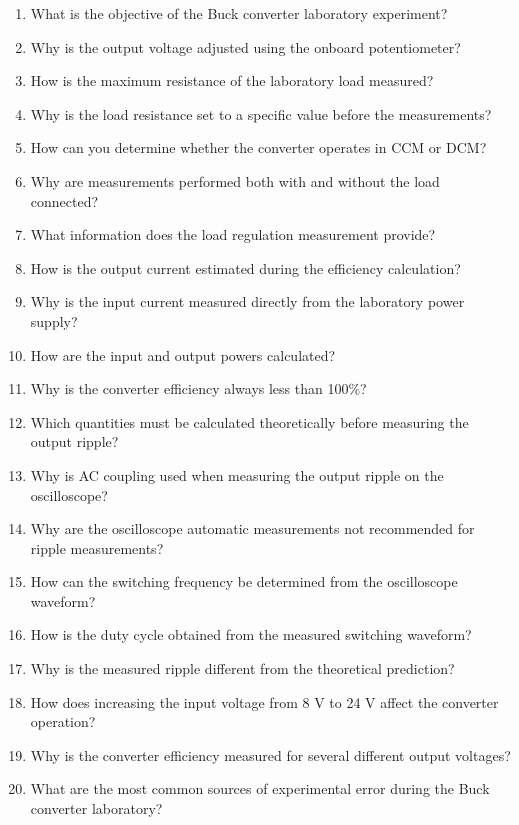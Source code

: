\documentclass[../main.tex]{subfiles}
\begin{document}
\begin{enumerate}[label=\textbf{\arabic*.}]
	\item What is the objective of the Buck converter laboratory experiment?
	\item Why is the output voltage adjusted using the onboard potentiometer?
	\item How is the maximum resistance of the laboratory load measured?
	\item Why is the load resistance set to a specific value before the measurements?
	\item How can you determine whether the converter operates in CCM or DCM?
	\item Why are measurements performed both with and without the load connected?
	\item What information does the load regulation measurement provide?
	\item How is the output current estimated during the efficiency calculation?
	\item Why is the input current measured directly from the laboratory power supply?
	\item How are the input and output powers calculated?
	\item Why is the converter efficiency always less than 100\%?
	\item Which quantities must be calculated theoretically before measuring the output ripple?
	\item Why is AC coupling used when measuring the output ripple on the oscilloscope?
	\item Why are the oscilloscope automatic measurements not recommended for ripple measurements?
	\item How can the switching frequency be determined from the oscilloscope waveform?
	\item How is the duty cycle obtained from the measured switching waveform?
	\item Why is the measured ripple different from the theoretical prediction?
	\item How does increasing the input voltage from 8 V to 24 V affect the converter operation?
	\item Why is the converter efficiency measured for several different output voltages?
	\item What are the most common sources of experimental error during the Buck converter laboratory?

\end{enumerate}
\end{document}

